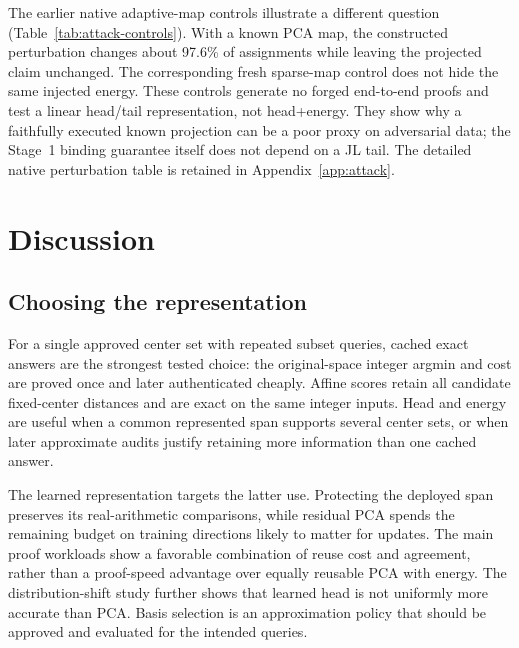 \documentclass[5p,times,twocolumn]{elsarticle}
\theoremstyle{plain}
\theoremstyle{definition}
\theoremstyle{remark}
\begin{document}
\par\endgroup
\begingroup\color{RevisionGreen}
The earlier native adaptive-map controls illustrate a different question (Table~\ref{tab:attack-controls}). With a known PCA map, the constructed perturbation changes about 97.6\% of assignments while leaving the projected claim unchanged. The corresponding fresh sparse-map control does not hide the same injected energy. These controls generate no forged end-to-end proofs and test a linear head/tail representation, not head+energy. They show why a faithfully executed known projection can be a poor proxy on adversarial data; the Stage~1 binding guarantee itself does not depend on a JL tail.
The detailed native perturbation table is retained in Appendix~\ref{app:attack}.


\par\endgroup


\section{\textcolor{RevisionRed}{Discussion}}\label{sec:discussion}
\subsection{\textcolor{RevisionRed}{Choosing the representation}}
\begingroup\color{RevisionRed}
For a single approved center set with repeated subset queries, cached exact answers are the strongest tested choice: the original-space integer argmin and cost are proved once and later authenticated cheaply. Affine scores retain all candidate fixed-center distances and are exact on the same integer inputs. Head and energy are useful when a common represented span supports several center sets, or when later approximate audits justify retaining more information than one cached answer.


\par\endgroup
\begingroup\color{RevisionRed}
The learned representation targets the latter use. Protecting the deployed span preserves its real-arithmetic comparisons, while residual PCA spends the remaining budget on training directions likely to matter for updates. The main proof workloads show a favorable combination of reuse cost and agreement, rather than a proof-speed advantage over equally reusable PCA with energy. The distribution-shift study further shows that learned head is not uniformly more accurate than PCA. Basis selection is an approximation policy that should be approved and evaluated for the intended queries.
\end{document}

